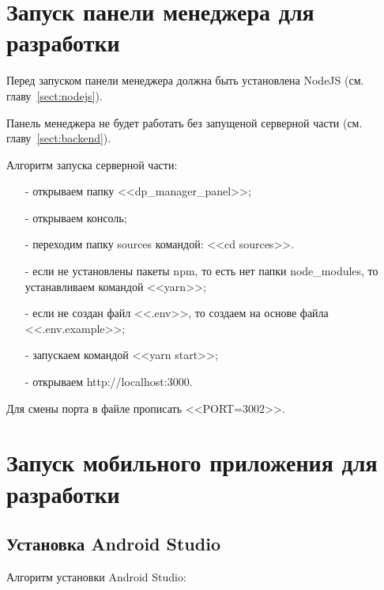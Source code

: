 \newpage
\section{Запуск панели менеджера для разработки}

Перед запуском панели менеджера должна быть установлена NodeJS (см. главу~\ref{sect:nodejs}).

Панель менеджера не будет работать без запущеной серверной части (см. главу~\ref{sect:backend}).

Алгоритм запуска серверной части:
\begin{enumerate}
    \item[-] открываем папку <<dp\_manager\_panel>>;
    \item[-] открываем консоль;
    \item[-] переходим папку sources командой: <<cd sources>>.
    \item[-] если не установлены пакеты npm, то есть нет папки node\_modules, то устанавливаем командой <<yarn>>;
    \item[-] если не создан файл <<.env>>, то создаем на основе файла <<.env.example>>;
    \item[-] запускаем командой <<yarn start>>;
    \item[-] открываем http://localhost:3000.
\end{enumerate}

Для смены порта в файле прописать <<PORT=3002>>.

\newpage
\section{Запуск мобильного приложения для разработки}

\subsection{Установка Android Studio}

Алгоритм установки Android Studio:

